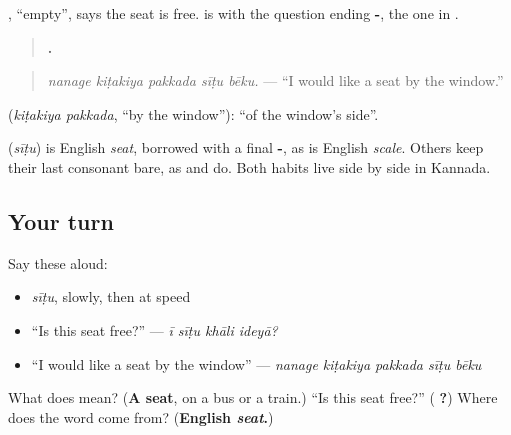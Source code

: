 \textbf{}, \textquotedblleft{}empty\textquotedblright{}, says the seat is free. \textbf{} is \textbf{} with the question ending \textbf{-}, the one in \textbf{  }.

\begin{quote}
\textbf{    .}
\end{quote}

\begin{quote}
\emph{nanage kiṭakiya pakkada sīṭu bēku.} — \textquotedblleft{}I would like a seat by the window.\textquotedblright{}
\end{quote}

\textbf{ } (\emph{kiṭakiya pakkada}, \textquotedblleft{}by the window\textquotedblright{}): \textquotedblleft{}of the window's side\textquotedblright{}.

\begin{cousinweb}
\textbf{} (\emph{sīṭu}) is English \emph{seat}, borrowed with a final \textbf{-}, as \textbf{} is English \emph{scale}. Others keep their last consonant bare, as \textbf{} and \textbf{} do. Both habits live side by side in Kannada.
\end{cousinweb}

\subsection*{Your turn}
Say these aloud:

\begin{itemize}
\raggedright
  \item \emph{sīṭu}, slowly, then at speed
  \item \textquotedblleft{}Is this seat free?\textquotedblright{} — \emph{ī sīṭu khāli ideyā?}
  \item \textquotedblleft{}I would like a seat by the window\textquotedblright{} — \emph{nanage kiṭakiya pakkada sīṭu bēku}
\end{itemize}

\begin{tcolorbox}[breakable,colback=teal!4,colframe=teal!35!black,title={Before you move on}]
What does \textbf{} mean? (\textbf{A seat}, on a bus or a train.) \textquotedblleft{}Is this seat free?\textquotedblright{} (\textbf{   ?}) Where does the word come from? (\textbf{English \emph{seat}.})
\end{tcolorbox}
